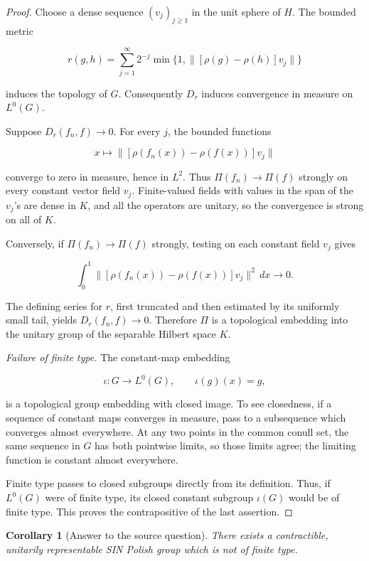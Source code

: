 \documentclass[11pt]{article}
\newtheorem{corollary}[theorem]{Corollary}
\begin{document}
\begin{proof}
Choose a dense sequence \((v_j)_{j\geq1}\) in the unit sphere of \(H\).  The
bounded metric

\[
 r(g,h)=\sum_{j=1}^{\infty}2^{-j}
 \min\bigl\{1,\|[\rho(g)-\rho(h)]v_j\|\bigr\}
\]

induces the topology of \(G\).  Consequently \(D_r\) induces convergence in
measure on \(L^0(G)\).

Suppose \(D_r(f_n,f)\to0\).  For every \(j\), the bounded functions

\[
 x\longmapsto\|[\rho(f_n(x))-\rho(f(x))]v_j\|
\]

converge to zero in measure, hence in \(L^2\).  Thus
\(\Pi(f_n)\to\Pi(f)\) strongly on every constant vector field \(v_j\).
Finite-valued fields with values in the span of the \(v_j\)'s are dense in
\(K\), and all the operators are unitary, so the convergence is strong on
all of \(K\).

Conversely, if \(\Pi(f_n)\to\Pi(f)\) strongly, testing on each constant
field \(v_j\) gives

\[
 \int_0^1\|[\rho(f_n(x))-\rho(f(x))]v_j\|^2\,dx\longrightarrow0.
\]

The defining series for \(r\), first truncated and then estimated by its
uniformly small tail, yields \(D_r(f_n,f)\to0\).  Therefore \(\Pi\) is a
topological embedding into the unitary group of the separable Hilbert space
\(K\).

\smallskip
\noindent\emph{Failure of finite type.}
The constant-map embedding

\[
 \iota:G\longrightarrow L^0(G),\qquad
 \iota(g)(x)=g,
\]

is a topological group embedding with closed image.  To see closedness,
if a sequence of constant maps converges in measure, pass to a subsequence
which converges almost everywhere.  At any two points in the common
conull set, the same sequence in \(G\) has both pointwise limits, so those
limits agree; the limiting function is constant almost everywhere.

Finite type passes to closed subgroups directly from its definition.  Thus,
if \(L^0(G)\) were of finite type, its closed constant subgroup
\(\iota(G)\) would be of finite type.  This proves the contrapositive of the
last assertion.
\end{proof}

\begin{corollary}[Answer to the source question]
There exists a contractible, unitarily representable SIN Polish group which
is not of finite type.
\end{corollary}
\end{document}
